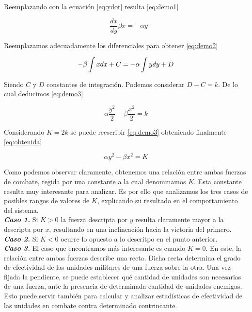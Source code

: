 \documentclass{sig-alternate}
\begin{document}
Reemplazando con la ecuación \eqref{eq:ydot} resulta \eqref{eq:demo1}

\begin{equation}
-\frac{dx}{dy}\beta x=-\alpha y
\label{eq:demo1}
\end{equation}

Reemplazamos adecuadamente los diferenciales para obtener \eqref{eq:demo2}

\begin{equation}
-\beta\intop x dx + C =-\alpha\int y dy + D
\label{eq:demo2}
\end{equation}

Siendo $C$ y $D$ constantes de integración. Podemos considerar $D - C = k$. De lo cual deducimos \eqref{eq:demo3}

\begin{equation}
\alpha\frac{y^{2}}{2}-\beta\frac{x^{2}}{2}=k
\label{eq:demo3}
\end{equation}


Considerando $K=2k$ se puede reescribir \eqref{eq:demo3} obteniendo finalmente \eqref{eq:obtenida}

\begin{equation}
\alpha y^{2}-\beta x^{2}=K
\label{eq:obtenida}
\end{equation}

Como podemos observar claramente, obtenemos una relación entre ambas fuerzas de combate, regida por una constante a la cual denominamos $K$. 
Esta constante resulta muy interesante para analizar. Es por ello que analizamos los tres casos de posibles rangos de valores de $K$, explicando
su resultado en el comportamiento del sistema.\\
\textbf{\textit{Caso 1.}} Si $K>0$ la fuerza descripta por $y$ resulta claramente mayor a la descripta por $x$, resultando en una inclincación hacia la victoria
del primero.\\
\textbf{\textit{Caso 2.}} Si $K<0$ ocurre lo opuesto a lo descritpo en el punto anterior.\\
\textbf{\textit{Caso 3.}} El caso que encontramos más interesante es cuando $K=0$. En este, la relación entre ambas fuerzas describe una recta. 
Dicha recta determina el grado de efectividad de las unidades militares de una fuerza sobre la otra. Una vez fijada la pendiente, se puede 
establecer qué cantidad de unidades son necesarias de una fuerza, ante la presencia de determinada cantidad de unidades enemigas. Esto puede servir también
para calcular y analizar estadísticas de efectividad de las unidades en combate contra determinado contrincante.
\end{document}
